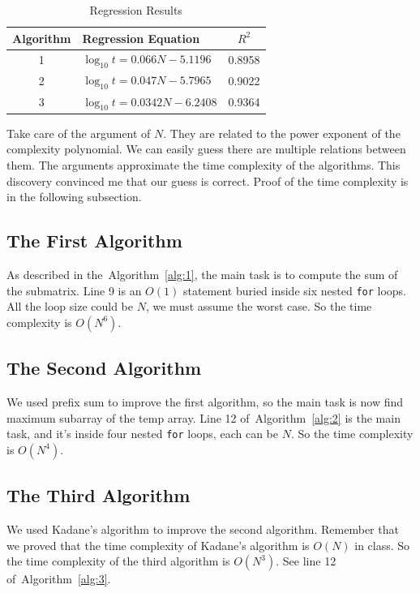 \documentclass[a4paper,oneside]{book}
\begin{document}
\begin{table}[!ht]
    \centering
    \caption{Regression Results}\label{tab:regression}
    \begin{tabular}{clc}
        \toprule
        Algorithm & Regression Equation & $R^2$ \\
        \midrule
        1         & $\log_{10}t=0.066N-5.1196$      & 0.8958 \\
        2         & $\log_{10}t=0.047N-5.7965$       & 0.9022 \\
        3         & $\log_{10}t=0.0342N-6.2408$       & 0.9364 \\
        \bottomrule
    \end{tabular}
\end{table}

Take care of the argument of $N$. They are related to the power exponent of the
complexity polynomial. We can easily guess there are multiple relations between
them. The arguments approximate the time complexity of the algorithms. This
discovery convinced me that our guess is correct. Proof of the time complexity
is in the following subsection.

\subsection{The First Algorithm}

As described in the~Algorithm~\ref{alg:1}, the main task is to compute the sum
of the submatrix. Line 9 is an $O(1)$ statement buried inside six nested
\verb|for| loops. All the loop size could be $N$, we must assume the worst case.
So the time complexity is $O(N^6)$.

\subsection{The Second Algorithm}

We used prefix sum to improve the first algorithm, so the main task is now find
maximum subarray of the temp array. Line 12 of~Algorithm~\ref{alg:2} is the main
task, and it's inside four nested \verb|for| loops, each can be $N$. So the time
complexity is $O(N^4)$.

\subsection{The Third Algorithm}

We used Kadane's algorithm to improve the second algorithm. Remember that we
proved that the time complexity of Kadane's algorithm is $O(N)$ in class. So the
time complexity of the third algorithm is $O(N^3)$. See line 12
of~Algorithm~\ref{alg:3}.
\end{document}
